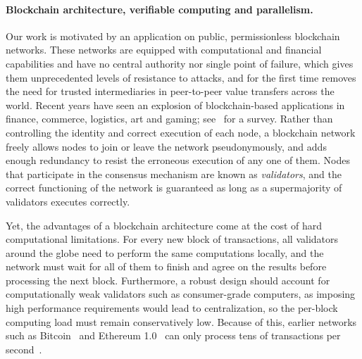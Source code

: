 \paragraph{Blockchain architecture, verifiable computing and parallelism.}
Our work is motivated by an application on public, permissionless blockchain networks. 
These networks are equipped with computational and financial capabilities and have no central authority nor single point of failure, which gives them unprecedented levels of resistance to attacks, and for the first time removes the need for trusted intermediaries in peer-to-peer value transfers across the world. Recent years have seen an explosion of blockchain-based applications in finance, commerce, logistics, art and gaming; see~\cite{maesa2020blockchain} for a survey. 
Rather than controlling the identity and correct execution of each node, a blockchain network freely allows nodes to join or leave the network pseudonymously, and adds enough redundancy to resist the erroneous execution of any one of them. 
Nodes that participate in the consensus mechanism are known as \emph{validators}, and the correct functioning of the network is guaranteed as long as a supermajority of validators executes correctly.

Yet, the advantages of a blockchain architecture come at the cost of hard computational limitations. For every new block of transactions, all validators around the globe need to perform the same computations locally, and the network must wait for all of them to finish and agree on the results before processing the next block. Furthermore, a robust design should account for computationally weak validators such as consumer-grade computers, as imposing high performance requirements would lead to centralization, so the per-block computing load must remain conservatively low. Because of this, earlier networks such as Bitcoin~\cite{nakamoto2019bitcoin} and Ethereum 1.0~\cite{wood2014ethereum} can only process tens of transactions per second~\cite{chauhan2018blockchain}. 

